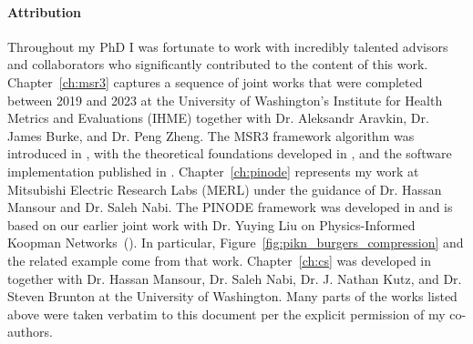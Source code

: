 \paragraph{Attribution} Throughout my PhD I was fortunate to work with incredibly talented advisors and collaborators who significantly contributed to the content of this work. Chapter~\ref{ch:msr3} captures a sequence of joint works that were completed between 2019 and 2023 at the University of Washington's Institute for Health Metrics and Evaluations (IHME) together with Dr. Aleksandr Aravkin, Dr. James Burke, and Dr. Peng Zheng. The MSR3 framework algorithm was introduced in \cite{sholokhov2022relaxation}, with the theoretical foundations developed in \cite{aravkin2022jimtheory}, and the software implementation published in \cite{sholokhov2023pysr3}. Chapter~\ref{ch:pinode} represents my work at Mitsubishi Electric Research Labs (MERL) under the guidance of Dr. Hassan Mansour and Dr. Saleh Nabi. The PINODE framework was developed in \cite{sholokhov2023pinode} and is based on our earlier joint work with Dr. Yuying Liu on Physics-Informed Koopman Networks~(\cite{liu2022physics}). In particular, Figure~\ref{fig:pikn_burgers_compression} and the related example come from that work. Chapter~\ref{ch:cs} was developed in~\cite{sholokhov2023cs} together with Dr. Hassan Mansour, Dr. Saleh Nabi, Dr. J. Nathan Kutz, and Dr. Steven Brunton at the University of Washington. Many parts of the works listed above were taken verbatim to this document per the explicit permission of my co-authors.